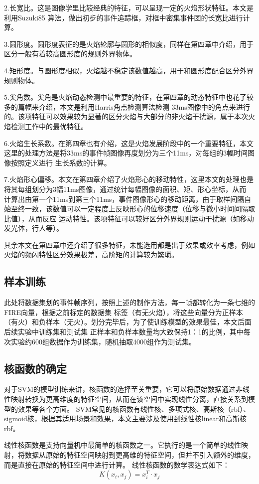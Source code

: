 2.长宽比。这是图像学里比较经典的特征，可以呈现一定的火焰形状特征。本文是利用Suzuki85 算法，做出初步的事件追踪框，对框中密集事件团的长宽比进行计算。

3.圆形度。圆形度表征的是火焰轮廓与圆形的相似度，同样在第四章中介绍，用于区分一般有着较高圆形度的规则外界物体。

4.矩形度。与圆形度相似，火焰越不稳定该数值越高，用于和圆形度配合区分外界规则物体。

5.尖角数。尖角是火焰动态检测中最重要的特征，在第四章的动态特征中也花了较多的篇幅来介绍，本文是利用Harris角点检测算法检测
33ms图像中的角点来进行的。该项特征可以效果较为显著的区分火焰与大部分的非火焰干扰源，属于本次火焰检测工作中的最优特征。

6.火焰生长系数。在第四章也有介绍，这是火焰发展阶段中的一个重要特征，本文这里的处理方法是将33ms的事件帧图像再度划分为三个11ms，对每组的3幅时间图像按照定义进行
生长系数的计算。

7.火焰形心偏移。本文在第四章介绍了火焰形心的移动特性，这里本文的处理也是将其每组划分为3幅11ms图像，通过统计每幅图像的面积、矩、形心坐标，从而
计算出由第一个11ms到第三个11ms，事件图像形心的移动距离，由于取样间隔自始至终一致，该数值可以一定程度上反映形心的位移速度（位移与微小时间间隔取比值），从而反应
运动特性。该项特征可以较好区分外界规则运动干扰源（如移动发光体，行人等）。

其余本文在第四章中还介绍了很多特征，未能选用都是出于效果或效率考虑，例如火焰的频闪特性区分效果极差，高阶矩的计算较为繁琐。
\subsection{样本训练}
此处将数据集划的事件帧序列，按照上述的制作方法，每一帧都转化为一条七维的FIRE向量，根据之前标定的数据集
标签（有无火焰），将这些向量分为正样本（有火）和负样本（无火）。划分完毕后，为了使训练模型的效果最佳，本文后面后续实验中训练集和测试集
正样本和负样本数量均大致保持1：1的比例，其中每次实验约600组数据作为训练集，随机抽取4000组作为测试集。
\subsection{核函数的确定}
对于SVM的模型训练来讲，核函数的选择至关重要，它可以将原始数据通过非线性映射转换为更高维度的特征空间，从而在该空间中实现线性分离，直接关系到模型的效果等各个方面。
SVM常见的核函数有线性核、多项式核、高斯核（rbf）、sigmoid核，根据其适用场景和效果，本文主要涉及使用到线性核linear和高斯核rbf。

线性核函数是支持向量机中最简单的核函数之一。它执行的是一个简单的线性映射，将数据从原始的特征空间映射到更高维的特征空间，但并不引入额外的维度，而是直接在原始的特征空间中进行计算。
线性核函数的数学表达式如下：
\begin{equation} 
    K(x_i,x_j)=x_i^T·x_j
\end{equation}

